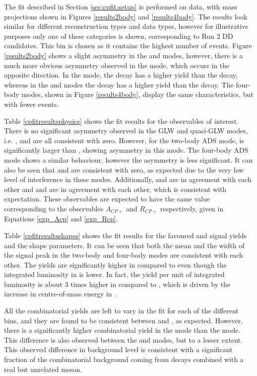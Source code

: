 The \CP fit described in Section \ref{sec:cpfit:setup} is performed on data, with mass projections shown in Figures \ref{results2body} and \ref{results4body}. The results look similar for different \KS reconstruction types and data types, however for illustrative purposes only one of these categories is shown, corresponding to Run 2 DD candidates. This bin is chosen as it contains the highest number of events. Figure \ref{results2body} shows a slight asymmetry in the \kk and \pipi modes, however, there is a much more obvious asymmetry observed in the \pik mode, which occurs in the opposite direction. In the \pik mode, the \Bp decay has a higher yield than the \Bm decay, whereas in the \kk and \pipi modes the \Bm decay has a higher yield than the \Bp decay. The four-body modes, shown in Figure \ref{results4body}, display the same characteristics, but with fewer events.

Table \ref{cpfitresultsphysics} shows the \CP fit results for the \CP observables of interest. There is no significant asymmetry observed in the GLW and quasi-GLW modes, i.e. \Akk, \Apipi and \Apipipipi are all consistent with zero. However, for the two-body ADS mode, \Rptwo is significantly larger than \Rmtwo, showing asymmetry in this mode. The four-body ADS mode shows a similar behaviour, however the asymmetry is less significant. It can also be seen that \Akpi and \Akpipipi are consistent with zero, as expected due to the very low level of interference in these modes. Additionally, \Akk and \Apipi are in agreement with each other and \Rkk and \Rpipi are in agreement with each other, which is consistent with expectation. These \CP observables are expected to have the same value corresponding to the observables $A_{CP+}$ and $R_{CP+}$ respectively, given in Equations \ref{exp_Acp} and \ref{exp_Rcp}.

Table \ref{cpfitresultsshapes} shows the fit results for the favoured \kpi and \kpipipi signal yields and the shape parameters. It can be seen that both the mean and the width of the signal peak in the two-body and four-body modes are consistent with each other. The yields are significantly higher in \runtwo compared to \runone even though the integrated luminosity in \runtwo is lower. In fact, the yield per unit of integrated luminosity is about 3 times higher in \runone compared to \runtwo, which is driven by the increase in centre-of-mass energy in \runtwo. 

All the combinatorial yields are left to vary in the \CP fit for each of the different bins, and they are found to be consistent between \Bm and \Bp, as expected. However, there is a significantly higher combinatorial yield in the \kpi mode than the \pik mode. This difference is also observed between the \kpipipi and \pikpipi modes, but to a lesser extent. This observed difference in background level is consistent with a significant fraction of the combinatorial background coming from  decays combined with a real but unrelated \KS meson. 

